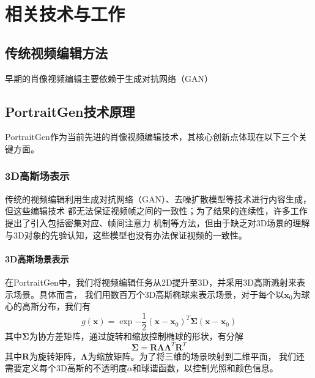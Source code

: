 \chapter{相关技术与工作}

\section{传统视频编辑方法}

早期的肖像视频编辑主要依赖于生成对抗网络（GAN）

\section{PortraitGen技术原理}

PortraitGen作为当前先进的肖像视频编辑技术，其核心创新点体现在以下三个关键方面。

\subsection{3D高斯场表示}

传统的视频编辑利用生成对抗网络（GAN）、去噪扩散模型等技术进行内容生成，但这些编辑技术
都无法保证视频帧之间的一致性；为了结果的连续性，许多工作提出了引入包括密集对应、帧间注意力
机制等方法，但由于缺乏对3D场景的理解与3D对象的先验认知，这些模型也没有办法保证视频的一致性。

\subsubsection{3D高斯场景表示}
在PortraitGen中，我们将视频编辑任务从2D提升至3D，并采用3D高斯溅射来表示场景。具体而言，
我们用数百万个3D高斯椭球来表示场景，对于每个以$\symbf{x}_0$为球心的高斯分布，我们有
\begin{equation}
    g(\symbf{x})=\exp{-\frac{1}{2}(\symbf{x}-\symbf{x}_0)^T\symbf{\Sigma}(\symbf{x}-\symbf{x}_0)}
\end{equation}
其中$\symbf{\Sigma}$为协方差矩阵，通过旋转和缩放控制椭球的形状，有分解
\begin{equation}
    \symbf{\Sigma}=\symbf{R}\symbf{\Lambda}\symbf{\Lambda}^T\symbf{R}^T
    \label{cov-decom}
\end{equation}
其中$\symbf{R}$为旋转矩阵，$\symbf{\Lambda}$为缩放矩阵。为了将三维的场景映射到二维平面，
我们还需要定义每个3D高斯的不透明度$\alpha$和球谐函数，以控制光照和颜色信息。

